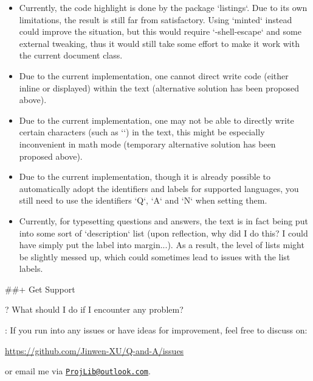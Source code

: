 \documentclass[%
  use style = classical,
  scroll,
]{Q-and-A}
\begin{document}
  \begin{itemize}
    \item Currently, the code highlight is done by the package `listings`. Due to its own limitations, the result is still far from satisfactory. Using `minted` instead could improve the situation, but this would require `-shell-escape` and some external tweaking, thus it would still take some effort to make it work with the current document class.
    \item Due to the current implementation, one cannot direct write code (either inline or displayed) within the text (alternative solution has been proposed above).
    \item Due to the current implementation, one may not be able to directly write certain characters (such as `\textasterisk`) in the text, this might be especially inconvenient in math mode (temporary alternative solution has been proposed above).
    \item Due to the current implementation, though it is already possible to automatically adopt the identifiers and labels for supported languages, you still need to use the identifiers `Q`, `A` and `N` when setting them.
    \item Currently, for typesetting questions and answers, the text is in fact being put into some sort of `description` list (upon reflection, why did I do this? I could have simply put the label into margin...). As a result, the level of lists might be slightly messed up, which could sometimes lead to issues with the list labels.
  \end{itemize}


##+ {Get Support}

?
  What should I do if I encounter any problem?

:
  If you run into any issues or have ideas for improvement, feel free to discuss on:
  \begin{center}
      \url{https://github.com/Jinwen-XU/Q-and-A/issues}
  \end{center}
  or email me via \href{mailto:ProjLib@outlook.com}{\texttt{ProjLib@outlook.com}}.


\vspace{3\baselineskip}



\end{document}
